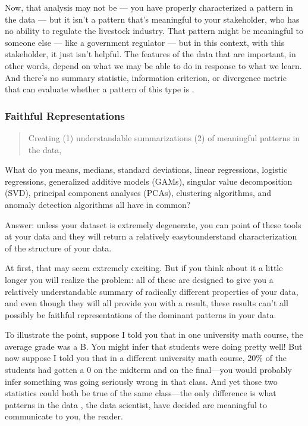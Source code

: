 \documentclass[letterpaper,10pt,english]{jupyterBook}
\begin{document}
\sphinxAtStartPar
Now, that analysis may not be  — you have properly characterized a pattern in the data — but it isn’t a pattern that’s meaningful to your stakeholder, who has no ability to regulate the livestock industry. That pattern might be meaningful to someone else — like a government regulator — but in this context, with this stakeholder, it just isn’t helpful. The features of the data that are important, in other words, depend on what we may be able to do in response to what we learn. And there’s no summary statistic, information criterion, or divergence metric that can evaluate whether a pattern of this type is .


\subsubsection{Faithful Representations}
\label{\detokenize{30_questions/15_answering_exploratory_questions:faithful-representations}}\begin{quote}

\sphinxAtStartPar
Creating (1) understandable summarizations (2) of meaningful patterns in the data, 
\end{quote}

\sphinxAtStartPar
What do you means, medians, standard deviations, linear regressions, logistic regressions, generalized additive models (GAMs), singular value decomposition (SVD), principal component analyses (PCAs), clustering algorithms, and anomaly detection algorithms all have in common?

\sphinxAtStartPar
Answer: unless your dataset is extremely degenerate, you can point  of these tools at your data and they will return a relatively easy\sphinxhyphen{}to\sphinxhyphen{}understand characterization of the structure of your data.

\sphinxAtStartPar
At first, that may seem extremely exciting. But if you think about it a little longer you will realize the problem: all of these are designed to give you a relatively understandable summary of radically different properties of your data, and even though they will all provide you with a result, these results can’t all possibly be faithful representations of the dominant patterns in your data.

\sphinxAtStartPar
To illustrate the point, suppose I told you that in one university math course, the average grade was a B\sphinxhyphen{}. You might infer that students were doing pretty well! But now suppose I told you that in a different university math course, 20\% of the students had gotten a 0 on the midterm and on the final—you would probably infer something was going seriously wrong in that class. And yet those two statistics could both be true of the same class—the only difference is what patterns in the data , the data scientist, have decided are meaningful to communicate to you, the reader.
\end{document}
